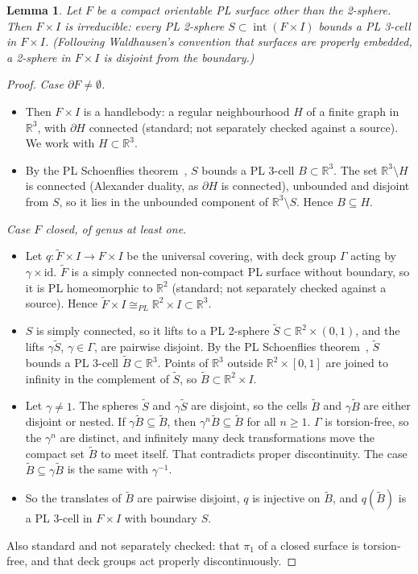 \documentclass[preprint,12pt]{elsarticle}
\newtheorem{lemma}[theorem]{Lemma}
\theoremstyle{definition}
\theoremstyle{remark}
\newcommand{\R}{\mathbb{R}}
\newcommand{\inter}{\operatorname{int}}
\begin{document}
\begin{lemma}\label{lem:irreducible}
Let $F$ be a compact orientable PL surface other than the 2-sphere. Then $F\times I$ is irreducible: every PL
2-sphere $S\subset\inter(F\times I)$ bounds a PL 3-cell in $F\times I$. (Following Waldhausen's convention that surfaces
are properly embedded, a 2-sphere in $F\times I$ is disjoint from the boundary.)
\end{lemma}
\begin{proof}
\emph{Case $\partial F\ne\emptyset$.}
\begin{itemize}
\item Then $F\times I$ is a handlebody: a regular neighbourhood $H$ of a finite graph in $\R^3$, with $\partial H$
connected (standard; not separately checked against a source). We work with $H\subset\R^3$.
\item By the PL Schoenflies theorem~\cite[Thm.~17.12]{Moise77}, $S$ bounds a PL 3-cell $B\subset\R^3$. The set
$\R^3\setminus H$ is connected (Alexander duality, as $\partial H$ is connected), unbounded and disjoint from $S$, so it
lies in the unbounded component of $\R^3\setminus S$. Hence $B\subseteq H$.
\end{itemize}
\emph{Case $F$ closed, of genus at least one.}
\begin{itemize}
\item Let $q\colon\tilde F\times I\to F\times I$ be the universal covering, with deck group $\Gamma$ acting by
$\gamma\times\mathrm{id}$. $\tilde F$ is a simply connected non-compact PL surface without boundary, so it is PL
homeomorphic to $\R^2$ (standard; not separately checked against a source). Hence $\tilde F\times I\cong_{PL}\R^2\times
I\subset\R^3$.
\item $S$ is simply connected, so it lifts to a PL 2-sphere $\tilde S\subset\R^2\times(0,1)$, and the lifts $\gamma\tilde S$,
$\gamma\in\Gamma$, are pairwise disjoint. By the PL Schoenflies theorem~\cite[Thm.~17.12]{Moise77}, $\tilde S$ bounds a
PL 3-cell $\tilde B\subset\R^3$. Points of $\R^3$ outside $\R^2\times[0,1]$ are joined to infinity in the complement of
$\tilde S$, so $\tilde B\subset\R^2\times I$.
\item Let $\gamma\ne1$. The spheres $\tilde S$ and $\gamma\tilde S$ are disjoint, so the cells $\tilde B$ and
$\gamma\tilde B$ are either disjoint or nested. If $\gamma\tilde B\subseteq\tilde B$, then $\gamma^n\tilde B\subseteq\tilde
B$ for all $n\ge1$. $\Gamma$ is torsion-free, so the $\gamma^n$ are distinct, and infinitely many deck transformations
move the compact set $\tilde B$ to meet itself. That contradicts proper discontinuity. The case $\tilde B\subseteq
\gamma\tilde B$ is the same with $\gamma^{-1}$.
\item So the translates of $\tilde B$ are pairwise disjoint, $q$ is injective on $\tilde B$, and $q(\tilde B)$ is a PL
3-cell in $F\times I$ with boundary $S$.
\end{itemize}
Also standard and not separately checked: that $\pi_1$ of a closed surface is torsion-free, and that deck groups act
properly discontinuously.
\end{proof}
\end{document}
